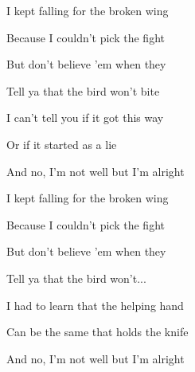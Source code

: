 \pagebreak

\begin{chorus*}
  I kept falling for the broken wing

  Because I couldn't pick the fight

  But don't believe 'em when they

  Tell ya that the bird won't bite\pause{}

  I can't tell you if it got this way

  Or if it started as a lie

  And no, I'm not well but I'm alright\pause{}
\end{chorus*}


\begin{chorus*}
  I kept falling for the broken wing

  Because I couldn't pick the fight

  But don't believe 'em when they

  Tell ya that the bird won't...\pause{}\Pause{}

  I had to learn that the helping hand

  Can be the same that holds the knife

  And no, I'm not well but I'm alright\pause{}
\end{chorus*}

